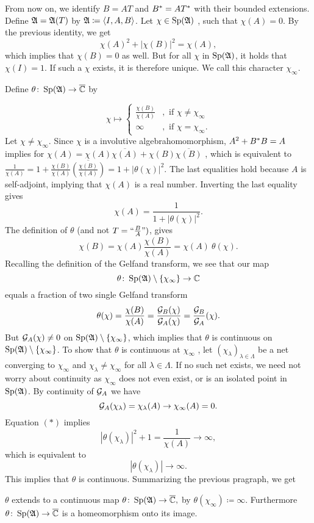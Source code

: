 From now on, we identify $B={AT}$ and $B^{*} ={AT^{*}}$
with their bounded extensions.
Define $\mathfrak{A} = \mathfrak{A}(T)$ by $\mathfrak{A} \coloneqq  \left\langle I, A, B  \right\rangle$. Let $ \chi \in \operatorname{Sp} (\mathfrak{A})$
, such that $\chi(A) =0$. By the previous identity, we get
\[
 \chi(A)^2 + |\chi(B)|^2 = \chi(A),
\]
which implies that $\chi(B) =0$ as well. But for all $\chi$ in  $\operatorname{Sp} (\mathfrak{A})$, 
 it holds that $\chi(I)=1$.
If such a $\chi$ exists, it is therefore unique. We call this
character $\chi_\infty$.

Define $\theta \colon \operatorname{Sp} (\mathfrak{A}) \to {\overline{\mathbb{C}}}$ by

 \[
 \chi \mapsto 
  \begin{cases}
    \frac{\chi(B)}{\chi(A)} &, \text{ if }\chi \neq \chi_\infty\\
    \infty &, \text{ if } \chi = \chi_\infty.
    \end{cases}
 \]
 Let $\chi \neq \chi_\infty$. Since $\chi$ is a involutive algebrahomomorphism,
 $A^2 + B^{*} B = A$ implies for
   $\chi(A) = \chi(A) \overline{\chi(A)} + \chi(B) \overline{\chi(B)} $
, which is equivalent to  
  $ \frac{1}{\chi(A)} = 1 + \frac{\chi(B)}{\chi(A)} 
  \overline{\left( \frac{\chi(B)}{\chi(A)} \right)} = 1 + | \theta(\chi)|^2$.
 The last equalities hold because $A$ is self-adjoint, implying that $\chi(A)$ is a real number.
 Inverting the last equality gives
\[
 \chi(A) = \frac{1}{1 + |\theta (\chi)|^2} \tag{$\ast$}.
\]
The definition of $\theta$ (and not  $T = 
`` \frac{B}{A} ")$, gives
\[
 \chi(B) = \chi(A) \frac{\chi(B)}{\chi(A)}= \chi(A)~ \theta(\chi) 
 \tag{$\ast \ast$}.
\]
Recalling the definition of the Gelfand transform, we see that our map
\[
 \theta \colon \operatorname{Sp}(\mathfrak{A}) \setminus \left\lbrace\chi_\infty\right\rbrace \to \mathbb{C}
\]
equals a fraction of two single Gelfand transform
\[
 \theta(\chi) = \frac{\chi(B)}{\chi(A)} = \frac{\mathcal{G}_B (\chi)}{\mathcal{G}_A (\chi)}=
 \frac{\mathcal{G}_B}{\mathcal{G}_A}(\chi).
\]
But $\mathcal{G}_A(\chi) \neq 0$ on $\operatorname{Sp}(\mathfrak{A}) \setminus \left\lbrace\chi_\infty\right\rbrace$, which implies
that $\theta$ is continuous on $\operatorname{Sp}(\mathfrak{A}) \setminus \left\lbrace\chi_\infty\right\rbrace$. 
To show that $\theta$ is continuous at $\chi_\infty$
, let $ \left( \chi_\lambda \right) 
_{\lambda \in \Lambda}$ be a net converging to $\chi_\infty$ and 
$\chi_\lambda \neq \chi_\infty$ for all $\lambda \in \Lambda$. If 
no such net exists, we need not worry about continuity as $\chi_\infty$
does not even exist, or is an isolated point in $\operatorname{Sp}(\mathfrak{A})$.
By continuity of $\mathcal{G}_A$ we have
\[
 \mathcal{G}_A (\chi_\lambda) = \chi_\lambda (A) \to \chi_\infty (A) = 0.
\]
Equation $(\ast)$ implies
\[
 | \theta( \chi_\lambda ) | ^2  + 1 = \frac{1}{\chi(A)} \to \infty,
\]
which is equivalent to 
\[
 | \theta (\chi_\lambda ) | \to \infty.
\]
This implies that $\theta$ is continuous. 
Summarizing the previous pragraph, we get 
\begin{lem}
$\theta$ extends to a continuous map $ \theta \colon \operatorname{Sp}(\mathfrak{A}) \to {\overline{\mathbb{C}}},$
by $\theta (\chi_\infty) \coloneqq \infty$.
Furthermore $\theta \colon \operatorname{Sp} (\mathfrak{A}) \to {\overline{\mathbb{C}}}$ is a homeomorphism onto its image.
\end{lem}

